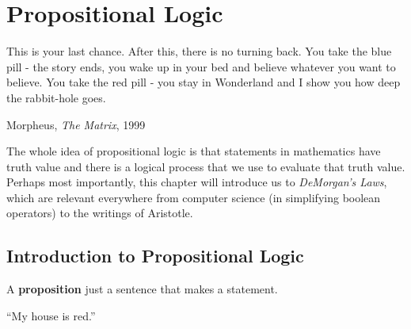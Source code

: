 \chapter{Propositional Logic}
\epigraph{This is your last chance. After this, there is no turning back. You
take the blue pill - the story ends, you wake up in your bed and believe
whatever you want to believe. You take the red pill - you stay in Wonderland and
I show you how deep the rabbit-hole goes.}{Morpheus, \emph{The Matrix}, 1999}
\label{ch:propositional}

The whole idea of propositional logic is that statements in mathematics have truth value and there is a logical process that we use to evaluate that truth value.
Perhaps most importantly, this chapter will introduce us to \emph{DeMorgan's Laws}, which are relevant everywhere from computer science (in simplifying boolean operators) to the writings of Aristotle.

\section{Introduction to Propositional Logic}
\label{sec:propintro}

\begin{defn}
  A \textbf{proposition} just a sentence that makes a statement.
\end{defn}
\begin{ex}
  ``My house is red.''
\end{ex}

